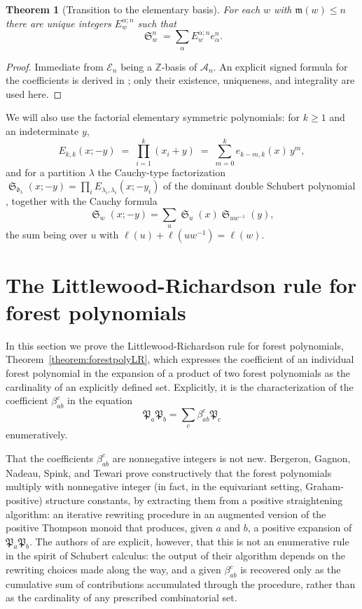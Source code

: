 \documentclass{amsart}
\newtheorem{theorem}{Theorem}[section]
\theoremstyle{definition}
\theoremstyle{remark}
\numberwithin{equation}{subsection}
\DeclareMathOperator{\sch}{\mathfrak{S}}
\newcommand{\coma}{\mathcal{A}}
\newcommand{\dom}{\mathfrak{d}}
\newcommand{\forest}{\mathfrak{P}}
\newcommand{\maxd}{\mathfrak{m}}
\begin{document}
\begin{theorem}[Transition to the elementary basis] \label{theorem:elemtrans}
For each $w$ with $\maxd(w)\leq n$ there are unique integers $E_w^{\alpha;n}$ such that
$$\sch_w^n = \sum_{\alpha}E_w^{\alpha;n}e_{\alpha}^n.$$
\end{theorem}
\begin{proof}
Immediate from $\mathcal{E}_n$ being a $\mathbb{Z}$-basis of $\coma_n$. An explicit signed formula for the coefficients is derived in \cite{companionbialgebra}; only their existence, uniqueness, and integrality are used here.
\end{proof}

We will also use the factorial elementary symmetric polynomials: for $k\geq 1$ and an indeterminate $y$,
$$E_{k,k}(x;-y)\;=\;\prod_{i=1}^{k}(x_i+y)\;=\;\sum_{m=0}^{k}e_{k-m,k}(x)\,y^{m},$$
and for a partition $\lambda$ the Cauchy-type factorization $\sch_{\dom_\lambda}(x;-y)=\prod_i E_{\lambda_i,\lambda_i}(x;-y_i)$ of the dominant double Schubert polynomial \cite[(6.14)]{notes}, together with the Cauchy formula
$$\sch_w(x;-y)=\sum_u \sch_u(x)\sch_{uw^{-1}}(y),$$
the sum being over $u$ with $\ell(u)+\ell(uw^{-1})=\ell(w)$.

\section{The Littlewood-Richardson rule for forest polynomials}\label{section:forestrule}

In this section we prove the Littlewood-Richardson rule for forest polynomials, Theorem~\ref{theorem:forestpolyLR}, which expresses the coefficient of an individual forest polynomial in the expansion of a product of two forest polynomials as the cardinality of an explicitly defined set. Explicitly, it is the characterization of the coefficient $\beta_{ab}^c$ in the equation
$$\forest_a\forest_b = \sum_{c}\beta_{ab}^c\forest_c$$
enumeratively.

That the coefficients $\beta_{ab}^c$ are nonnegative integers is not new. Bergeron, Gagnon, Nadeau, Spink, and Tewari \cite{bergeron2025equivariant} prove constructively that the forest polynomials multiply with nonnegative integer (in fact, in the equivariant setting, Graham-positive) structure constants, by extracting them from a positive straightening algorithm: an iterative rewriting procedure in an augmented version of the positive Thompson monoid that produces, given $a$ and $b$, a positive expansion of $\forest_a \forest_b$. The authors of \cite{bergeron2025equivariant} are explicit, however, that this is not an enumerative rule in the spirit of Schubert calculus: the output of their algorithm depends on the rewriting choices made along the way, and a given $\beta_{ab}^c$ is recovered only as the cumulative sum of contributions accumulated through the procedure, rather than as the cardinality of any prescribed combinatorial set.
\end{document}
